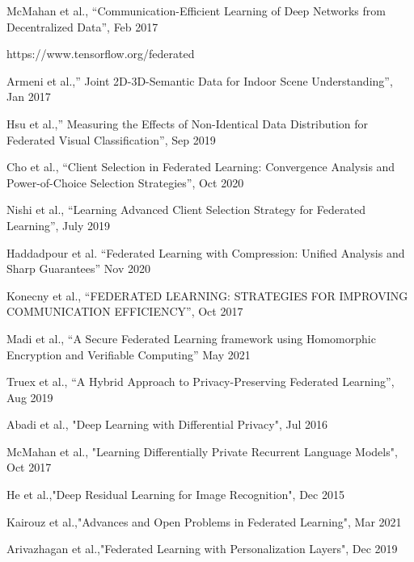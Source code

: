 \documentclass[11pt]{article}
\begin{document}
\pagebreak

\begin{thebibliography}{9}

McMahan et al., “Communication-Efficient Learning of Deep Networks from Decentralized Data”, Feb 2017

https://www.tensorflow.org/federated

Armeni et al.,” Joint 2D-3D-Semantic Data for Indoor Scene Understanding”, Jan 2017

Hsu et al.,” Measuring the Effects of Non-Identical Data Distribution for Federated Visual Classification”, Sep 2019

Cho et al., “Client Selection in Federated Learning: Convergence Analysis and Power-of-Choice Selection Strategies”, Oct 2020

Nishi et al., “Learning Advanced Client Selection Strategy for Federated Learning”, July 2019

Haddadpour et al. “Federated Learning with Compression: Unified Analysis and Sharp Guarantees” Nov 2020

Konecny et al., “FEDERATED LEARNING: STRATEGIES FOR IMPROVING COMMUNICATION EFFICIENCY”, Oct 2017

Madi et al., “A Secure Federated Learning framework using Homomorphic Encryption and Verifiable Computing” May 2021

Truex et al., “A Hybrid Approach to Privacy-Preserving Federated Learning”, Aug 2019

Abadi et al., "Deep Learning with Differential Privacy", Jul 2016

McMahan et al., "Learning Differentially Private Recurrent Language Models", Oct 2017

He et al.,"Deep Residual Learning for Image Recognition", Dec 2015

Kairouz et al.,"Advances and Open Problems in Federated Learning", Mar 2021

Arivazhagan et al.,"Federated Learning with Personalization Layers", Dec 2019

\end{thebibliography}
\end{document}
